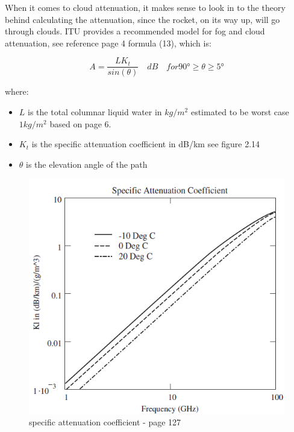 When it comes to cloud attenuation, it makes sense to look in to the theory behind calculating the attenuation, since the rocket, on its way up, will go through clouds. ITU provides a recommended model for fog and cloud attenuation, see reference \cite{ITUCloud} page 4 formula (13), which is: 

\begin{equation}
    A = \frac{LK_t}{sin(\theta)} \quad dB \quad for \ang{90}\geq\theta\geq\ang{5}
\end{equation}

where:

\begin{itemize}
  \item $L$ is the total columnar liquid water in $kg/m^2$ estimated to be worst case $1kg/m^2$ based on \cite{ITUCloud} page 6. 
  \item $K_t$ is the specific attenuation coefficient in dB/km see figure 2.14
  \item $\theta$ is the elevation angle of the path
\end{itemize}

\begin{figure}[h]
\centering
\includegraphics[scale=0.7]{figures/Kl.PNG}
\caption{specific attenuation coefficient\cite{RFpropagation} - page 127}
\end{figure}


